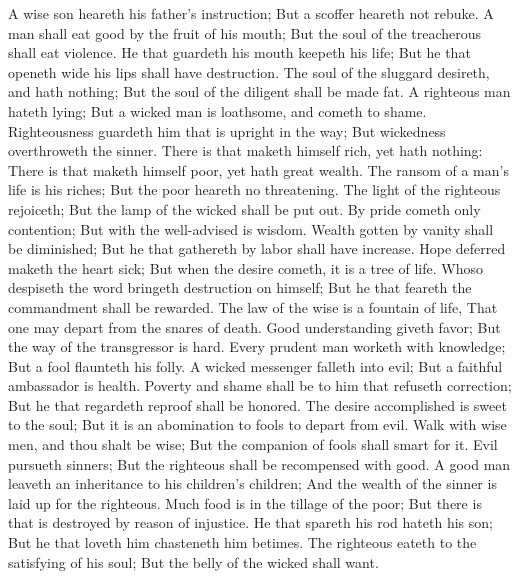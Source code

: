 A wise son heareth his father’s instruction; But a scoffer heareth not rebuke.  A man shall eat good by the fruit of his mouth; But the soul of the treacherous shall eat violence.  He that guardeth his mouth keepeth his life; But he that openeth wide his lips shall have destruction.  The soul of the sluggard desireth, and hath nothing; But the soul of the diligent shall be made fat.  A righteous man hateth lying; But a wicked man is loathsome, and cometh to shame.  Righteousness guardeth him that is upright in the way; But wickedness overthroweth the sinner.  There is that maketh himself rich, yet hath nothing: There is that maketh himself poor, yet hath great wealth.  The ransom of a man’s life is his riches; But the poor heareth no threatening.  The light of the righteous rejoiceth; But the lamp of the wicked shall be put out.  By pride cometh only contention; But with the well-advised is wisdom.  Wealth gotten by vanity shall be diminished; But he that gathereth by labor shall have increase.  Hope deferred maketh the heart sick; But when the desire cometh, it is a tree of life.  Whoso despiseth the word bringeth destruction on himself; But he that feareth the commandment shall be rewarded.  The law of the wise is a fountain of life, That one may depart from the snares of death.  Good understanding giveth favor; But the way of the transgressor is hard.  Every prudent man worketh with knowledge; But a fool flaunteth his folly.  A wicked messenger falleth into evil; But a faithful ambassador is health.  Poverty and shame shall be to him that refuseth correction; But he that regardeth reproof shall be honored.  The desire accomplished is sweet to the soul; But it is an abomination to fools to depart from evil.  Walk with wise men, and thou shalt be wise; But the companion of fools shall smart for it.  Evil pursueth sinners; But the righteous shall be recompensed with good.  A good man leaveth an inheritance to his children’s children; And the wealth of the sinner is laid up for the righteous.  Much food is in the tillage of the poor; But there is that is destroyed by reason of injustice.  He that spareth his rod hateth his son; But he that loveth him chasteneth him betimes.  The righteous eateth to the satisfying of his soul; But the belly of the wicked shall want. 

